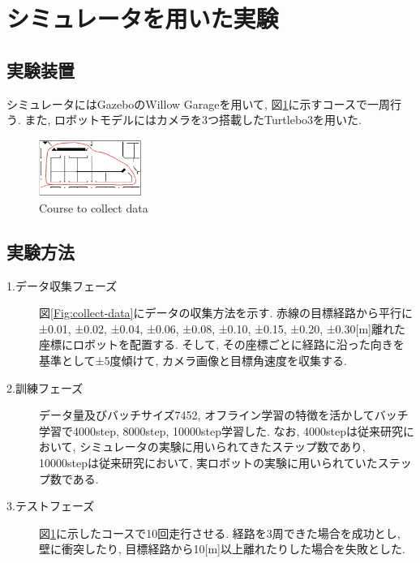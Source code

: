 \documentclass[10pt]{ujarticle}
\begin{document}
    \newpage
    \section{シミュレータを用いた実験}%
    \subsection{実験装置}シミュレータにはGazeboのWillow Garage\cite{willow}を用いて, 図\ref{Fig:willow}に示すコースで一周行う. また, ロボットモデルにはカメラを3つ搭載したTurtlebo3\cite{turtlebot3}を用いた. 

    \begin{figure}[h]
        \centering
        \includegraphics[width=0.3\textwidth]{fig/willow-garage.png}
        \caption{Course to collect data}
        \label{Fig:willow}
    \end{figure}

    \subsection{実験方法}
    \begin{description}
        \item[1.データ収集フェーズ]図\ref{Fig:collect-data}にデータの収集方法を示す. 赤線の目標経路から平行に±0.01, ±0.02, ±0.04, ±0.06, ±0.08, ±0.10, ±0.15, ±0.20, ±0.30[m]離れた座標にロボットを配置する. そして, その座標ごとに経路に沿った向きを基準として±5度傾けて, カメラ画像と目標角速度を収集する. 
        \item[2.訓練フェーズ]データ量及びバッチサイズ7452, オフライン学習の特徴を活かしてバッチ学習で4000step, 8000step, 10000step学習した. なお, 4000stepは従来研究において, シミュレータの実験に用いられてきたステップ数であり, 10000stepは従来研究において, 実ロボットの実験に用いられていたステップ数である. 
        \item[3.テストフェーズ]図\ref{Fig:willow}に示したコースで10回走行させる. 経路を3周できた場合を成功とし, 壁に衝突したり, 目標経路から10[m]以上離れたりした場合を失敗とした. 
    \end{description}
\end{document}
